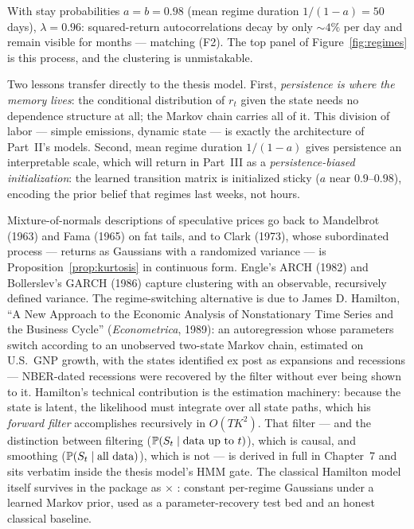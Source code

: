 With stay probabilities $a = b = 0.98$ (mean regime duration
$1/(1-a) = 50$ days), $\lambda = 0.96$: squared-return autocorrelations
decay by only $\sim\!4\%$ per day and remain visible for months ---
matching (F2). The top panel of Figure~\ref{fig:regimes} is this process,
and the clustering is unmistakable.

Two lessons transfer directly to the thesis model. First, \emph{persistence
is where the memory lives}: the conditional distribution of $r_t$ given the
state needs no dependence structure at all; the Markov chain carries all of
it. This division of labor --- simple emissions, dynamic state --- is
exactly the architecture of Part~II's models. Second, mean regime duration
$1/(1-a)$ gives persistence an interpretable scale, which will return in
Part~III as a \emph{persistence-biased initialization}: the learned
transition matrix is initialized sticky ($a$ near $0.9$--$0.98$), encoding
the prior belief that regimes last weeks, not hours.

\begin{origins}
Mixture-of-normals descriptions of speculative prices go back to Mandelbrot
(1963) and Fama (1965) on fat tails, and to Clark (1973), whose subordinated
process --- returns as Gaussians with a randomized variance --- is
Proposition~\ref{prop:kurtosis} in continuous form. Engle's ARCH (1982) and
Bollerslev's GARCH (1986) capture clustering with an observable, recursively
defined variance. The regime-switching alternative is due to James D.
Hamilton, ``A New Approach to the Economic Analysis of Nonstationary Time
Series and the Business Cycle'' (\emph{Econometrica}, 1989): an
autoregression whose parameters switch according to an unobserved two-state
Markov chain, estimated on U.S.\ GNP growth, with the states identified
ex post as expansions and recessions --- NBER-dated recessions were
recovered by the filter without ever being shown to it. Hamilton's technical
contribution is the estimation machinery: because the state is latent, the
likelihood must integrate over all state paths, which his \emph{forward
filter} accomplishes recursively in $O(TK^2)$. That filter --- and the
distinction between filtering ($\mathbb{P}(S_t \mid \text{data up to } t)$),
which is causal, and smoothing ($\mathbb{P}(S_t \mid \text{all data})$), which
is not --- is derived in full in Chapter~7 and sits verbatim inside the
thesis model's HMM gate. The classical Hamilton model itself survives in the
package as  $\times$
: constant per-regime Gaussians under a
learned Markov prior, used as a parameter-recovery test bed and an honest
classical baseline.
\end{origins}

